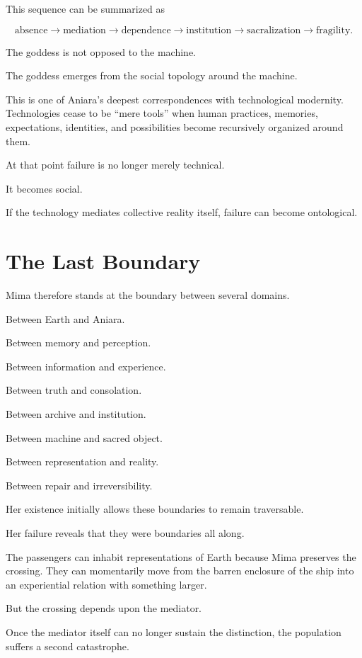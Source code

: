 \documentclass[11pt,oneside]{book}
\theoremstyle{definition}
\theoremstyle{remark}
\begin{document}
This sequence can be summarized as

\[
\text{absence}
\rightarrow
\text{mediation}
\rightarrow
\text{dependence}
\rightarrow
\text{institution}
\rightarrow
\text{sacralization}
\rightarrow
\text{fragility}.
\]

The goddess is not opposed to the machine.

The goddess emerges from the social topology around the machine.

This is one of Aniara's deepest correspondences with technological modernity. Technologies cease to be ``mere tools'' when human practices, memories, expectations, identities, and possibilities become recursively organized around them.

At that point failure is no longer merely technical.

It becomes social.

If the technology mediates collective reality itself, failure can become ontological.

\section{The Last Boundary}

Mima therefore stands at the boundary between several domains.

Between Earth and Aniara.

Between memory and perception.

Between information and experience.

Between truth and consolation.

Between archive and institution.

Between machine and sacred object.

Between representation and reality.

Between repair and irreversibility.

Her existence initially allows these boundaries to remain traversable.

Her failure reveals that they were boundaries all along.

The passengers can inhabit representations of Earth because Mima preserves the crossing. They can momentarily move from the barren enclosure of the ship into an experiential relation with something larger.

But the crossing depends upon the mediator.

Once the mediator itself can no longer sustain the distinction, the population suffers a second catastrophe.
\end{document}
